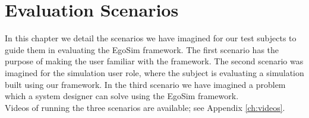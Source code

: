 \chapter{Evaluation Scenarios}\label{ch:evaluation_scenarios}
In this chapter we detail the scenarios we have imagined for our test subjects to guide them in evaluating the EgoSim framework. The first scenario has the purpose of making the user familiar with the framework. The second scenario was imagined for the simulation user role, where the subject is evaluating a simulation built using our framework. In the third scenario we have imagined a problem which a system designer can solve using the EgoSim framework.\\

Videos of running the three scenarios are available; see Appendix \ref{ch:videos}.\\




